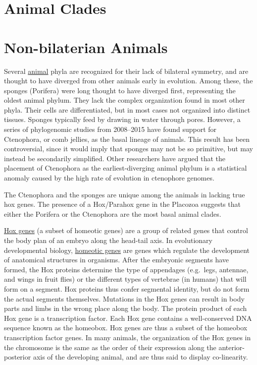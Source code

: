 \section{Animal Clades}\label{animal-clades}

\section{Non-bilaterian Animals}\label{non-bilaterian-animals}

Several \href{https://en.wikipedia.org/wiki/Animal}{animal} phyla are
recognized for their lack of bilateral symmetry, and are thought to have
diverged from other animals early in evolution. Among these, the sponges
(Porifera) were long thought to have diverged first, representing the
oldest animal phylum. They lack the complex organization found in most
other phyla. Their cells are differentiated, but in most cases not
organized into distinct tissues. Sponges typically feed by drawing in
water through pores. However, a series of phylogenomic studies from
2008--2015 have found support for Ctenophora, or comb jellies, as the
basal lineage of animals. This result has been controversial, since it
would imply that sponges may not be so primitive, but may instead be
secondarily simplified. Other researchers have argued that the placement
of Ctenophora as the earliest-diverging animal phylum is a statistical
anomaly caused by the high rate of evolution in ctenophore genomes.

The Ctenophora and the sponges are unique among the animals in lacking
true hox genes. The presence of a Hox/Parahox gene in the Placozoa
suggests that either the Porifera or the Ctenophora are the most basal
animal clades.

\href{https://en.wikipedia.org/wiki/Hox_gene}{Hox genes} (a subset of
homeotic genes) are a group of related genes that control the body plan
of an embryo along the head-tail axis. In evolutionary developmental
biology, \href{https://en.wikipedia.org/wiki/Homeotic_gene}{homeotic genes} are genes which regulate the development of
anatomical structures in organisms. After the embryonic segments have
formed, the Hox proteins determine the type of appendages (e.g.~legs,
antennae, and wings in fruit flies) or the different types of vertebrae
(in humans) that will form on a segment. Hox proteins thus confer
segmental identity, but do not form the actual segments themselves.
Mutations in the Hox genes can result in body parts and limbs in the
wrong place along the body. The protein product of each Hox gene is a
transcription factor. Each Hox gene contains a well-conserved DNA
sequence known as the homeobox. Hox genes are thus a subset of the
homeobox transcription factor genes. In many animals, the organization
of the Hox genes in the chromosome is the same as the order of their
expression along the anterior-posterior axis of the developing animal,
and are thus said to display co-linearity.

